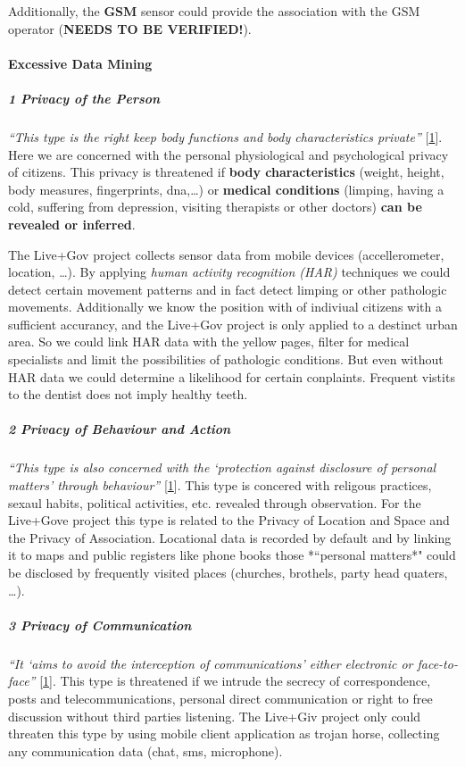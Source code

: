 Additionally, the \textbf{GSM} sensor could provide the association with
the GSM operator (\textbf{NEEDS TO BE VERIFIED!}).

\paragraph{Excessive Data Mining}

\subparagraph{1 Privacy of the Person}

\emph{``This type is the right keep body functions and body
characteristics private''} {[}\hyperref[references]{1}{]}. Here we are
concerned with the personal physiological and psychological privacy of
citizens. This privacy is threatened if \textbf{body characteristics}
(weight, height, body measures, fingerprints, dna,\ldots{}) or
\textbf{medical conditions} (limping, having a cold, suffering from
depression, visiting therapists or other doctors) \textbf{can be
revealed or inferred}.

The Live+Gov project collects sensor data from mobile devices
(accellerometer, location, \ldots{}). By applying \emph{human activity
recognition (HAR)} techniques we could detect certain movement patterns
and in fact detect limping or other pathologic movements. Additionally
we know the position with of indiviual citizens with a sufficient
accurancy, and the Live+Gov project is only applied to a destinct urban
area. So we could link HAR data with the yellow pages, filter for
medical specialists and limit the possibilities of pathologic
conditions. But even without HAR data we could determine a likelihood
for certain conplaints. Frequent vistits to the dentist does not imply
healthy teeth.

\subparagraph{2 Privacy of Behaviour and Action}

\emph{``This type is also concerned with the `protection against
disclosure of personal matters' through behaviour''}
{[}\hyperref[references]{1}{]}. This type is concered with religous
practices, sexaul habits, political activities, etc. revealed through
observation. For the Live+Gove project this type is related to the
Privacy of Location and Space and the Privacy of Association. Locational
data is recorded by default and by linking it to maps and public
registers like phone books those *``personal matters*" could be
disclosed by frequently visited places (churches, brothels, party head
quaters, \ldots{}).

\subparagraph{3 Privacy of Communication}

\emph{``It `aims to avoid the interception of communications' either
electronic or face-to-face''} {[}\hyperref[references]{1}{]}. This type
is threatened if we intrude the secrecy of correspondence, posts and
telecommunications, personal direct communication or right to free
discussion without third parties listening. The Live+Giv project only
could threaten this type by using mobile client application as trojan
horse, collecting any communication data (chat, sms, microphone).

